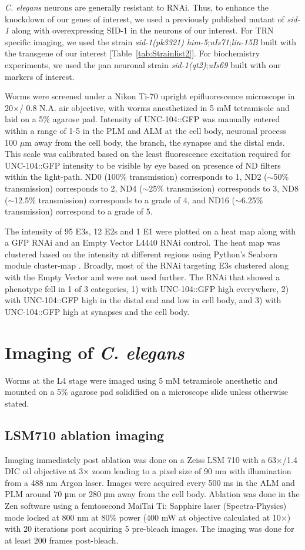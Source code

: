 \textit{C. elegans} neurons are generally resistant to RNAi. Thus, to enhance the knockdown of our genes of interest, we used a previously published mutant of \textit{sid-1} along with overexpressing SID-1 in the neurons of our interest. For TRN specific imaging, we used the strain \textit{sid-1(pk3321) him-5};\textit{uIs71};\textit{lin-15B} built with the transgene of our interest [Table~\ref{tab:Strainlist2}]. For biochemistry experiments, we used the pan neuronal strain \textit{sid-1(qt2)};\textit{uIs69} built with our markers of interest.

Worms were screened under a Nikon Ti-70 upright epifluorescence microscope in 20$\times$/ 0.8 N.A. air objective, with worms anesthetized in 5 mM tetramisole and laid on a 5\% agarose pad. Intensity of UNC-104::GFP was manually entered within a range of 1-5 in the PLM and ALM at the cell body, neuronal process 100 $\mu$m away from the cell body, the branch, the synapse and the distal ends. This scale was calibrated based on the least fluorescence excitation required for UNC-104::GFP intensity to be visible by eye based on presence of ND filters within the light-path. ND0 (100\% transmission) corresponds to 1, ND2 ($\sim$50\% transmission) corresponds to 2, ND4 ($\sim$25\% transmission) corresponds to 3, ND8 ($\sim$12.5\% transmission)  corresponds to a grade of 4, and ND16 ($\sim$6.25\% transmission) correspond to a grade of 5.

The intensity of 95 E3s, 12 E2s and 1 E1 were plotted on a heat map along with a GFP RNAi and an Empty Vector L4440 RNAi control. The heat map was clustered based on the intensity at different regions using Python’s Seaborn module cluster-map \parencite{waskom2021}. Broadly, most of the RNAi targeting E3s clustered along with the Empty Vector and were not used further. The RNAi that showed a phenotype fell in 1 of 3 categories, 1) with UNC-104::GFP high everywhere, 2) with UNC-104::GFP high in the distal end and low in cell body, and 3) with UNC-104::GFP high at synapses and the cell body.

\section{Imaging of \textit{C. elegans}}

Worms at the L4 stage were imaged using 5 mM tetramisole anesthetic and mounted on a 5\% agarose pad solidified on a microscope slide unless otherwise stated.

\subsection{LSM710 ablation imaging}
Imaging immediately post ablation was done on a Zeiss LSM 710 with a 63$\times$/1.4 DIC oil objective at 3$\times$ zoom leading to a pixel size of 90 nm with illumination from a 488 nm Argon laser. Images were acquired every 500 ms in the ALM and PLM around 70 μm or 280 μm away from the cell body. Ablation was done in the Zen software using a femtosecond MaiTai Ti: Sapphire laser (Spectra-Physics) mode locked at 800 nm at 80\% power (400 mW at objective calculated at 10$\times$) with 20 iterations post acquiring 5 pre-bleach images. The imaging was done for at least 200 frames post-bleach.

